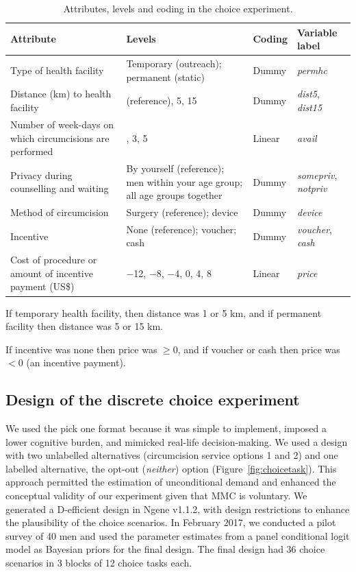 \documentclass[11pt]{article}
\numberwithin{equation}{section}\numberwithin{figure}{section}\numberwithin{table}{section}
\begin{document}
\begin{table}[!htbp]
\centering
\caption{Attributes, levels and coding in the choice experiment.}\label{tab:attributes}
\small
\begin{threeparttable}
\begin{tabular}{>{\raggedright\arraybackslash}p{5.2cm}>{\raggedright\arraybackslash}p{4.6cm}ll}
\toprule
Attribute & Levels & Coding & Variable label \\
\midrule
Type of health facility\tnote{a} & Temporary (outreach); permanent (static) & Dummy & \emph{permhc} \\
Distance (km) to health facility & 1 (reference), 5, 15 & Dummy & \emph{dist5}, \emph{dist15} \\
Number of week-days on which circumcisions are performed & 1, 3, 5 & Linear & \emph{avail} \\
Privacy during counselling and waiting & By yourself (reference); men within your age group; all age groups together & Dummy & \emph{somepriv}, \emph{notpriv} \\
Method of circumcision & Surgery (reference); device & Dummy & \emph{device} \\
Incentive & None (reference); voucher; cash & Dummy & \emph{voucher}, \emph{cash} \\
Cost of procedure or amount of incentive payment (US\$)\tnote{b} & $-$12, $-$8, $-$4, 0, 4, 8 & Linear & \emph{price} \\
\bottomrule
\end{tabular}
\begin{tablenotes}\footnotesize
\item[a] If temporary health facility, then distance was 1 or 5 km, and if permanent facility then distance was 5 or 15 km.
\item[b] If incentive was none then price was $\geq 0$, and if voucher or cash then price was $< 0$ (an incentive payment).
\end{tablenotes}
\end{threeparttable}
\end{table}

\subsection{Design of the discrete choice experiment}
We used the pick one format because it was simple to implement, imposed a lower cognitive burden, and mimicked real-life decision-making.\cite{RN70} We used a design with two unlabelled alternatives (circumcision service options 1 and 2) and one labelled alternative, the opt-out (\emph{neither}) option (Figure~\ref{fig:choicetask}). This approach permitted the estimation of unconditional demand and enhanced the conceptual validity of our experiment given that MMC is voluntary. We generated a D-efficient design in \textsf{Ngene} v1.1.2,\cite{RN288} with design restrictions to enhance the plausibility of the choice scenarios.\cite{RN78} In February 2017, we conducted a pilot survey of 40 men and used the parameter estimates from a panel conditional logit model as Bayesian priors for the final design. The final design had 36 choice scenarios in 3 blocks of 12 choice tasks each.
\end{document}
